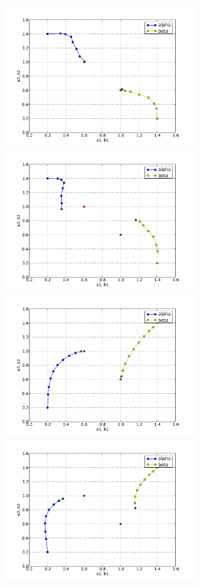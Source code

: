 \begin{figure}
  \begin{center}
    \includegraphics[width=7cm]{chapters/schroll/pdf/4D-1scan1b.pdf}
    \includegraphics[width=7cm]{chapters/schroll/pdf/4D-1scan1b-5.pdf}
    \includegraphics[width=7cm]{chapters/schroll/pdf/4D-1scan2b.pdf}
    \includegraphics[width=7cm]{chapters/schroll/pdf/4D-1scan2b-5.pdf}

\end{center}
\end{figure}
